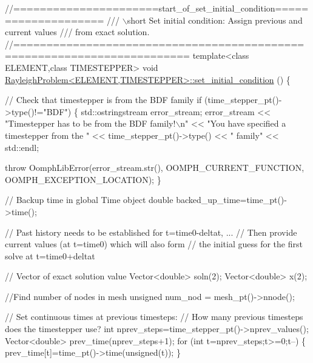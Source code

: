 \begin{DoxyCodeInclude}
\textcolor{comment}{//======================start\_of\_set\_initial\_condition====================}
\textcolor{comment}{/// \(\backslash\)short Set initial condition: Assign previous and current values}
\textcolor{comment}{}\textcolor{comment}{/// from exact solution.}
\textcolor{comment}{}\textcolor{comment}{//========================================================================}
\textcolor{keyword}{template}<\textcolor{keyword}{class} ELEMENT,\textcolor{keyword}{class} TIMESTEPPER>
\textcolor{keywordtype}{void} \hyperlink{classRayleighProblem_a5c54c02c45c656cabbe8f8808e2cfd6b}{RayleighProblem<ELEMENT,TIMESTEPPER>::set\_initial\_condition}
      ()
\{ 

 \textcolor{comment}{// Check that timestepper is from the BDF family}
 \textcolor{keywordflow}{if} (time\_stepper\_pt()->type()!=\textcolor{stringliteral}{"BDF"})
  \{
   std::ostringstream error\_stream;
   error\_stream << \textcolor{stringliteral}{"Timestepper has to be from the BDF family!\(\backslash\)n"}
                << \textcolor{stringliteral}{"You have specified a timestepper from the "}
                << time\_stepper\_pt()->type() << \textcolor{stringliteral}{" family"} << std::endl;

   \textcolor{keywordflow}{throw} OomphLibError(error\_stream.str(),
                       OOMPH\_CURRENT\_FUNCTION,
                       OOMPH\_EXCEPTION\_LOCATION);
  \}

 \textcolor{comment}{// Backup time in global Time object}
 \textcolor{keywordtype}{double} backed\_up\_time=time\_pt()->time();
         
 \textcolor{comment}{// Past history needs to be established for t=time0-deltat, ...}
 \textcolor{comment}{// Then provide current values (at t=time0) which will also form}
 \textcolor{comment}{// the initial guess for the first solve at t=time0+deltat}
 
 \textcolor{comment}{// Vector of exact solution value}
 Vector<double> soln(2);
 Vector<double> x(2);

 \textcolor{comment}{//Find number of nodes in mesh}
 \textcolor{keywordtype}{unsigned} num\_nod = mesh\_pt()->nnode();

 \textcolor{comment}{// Set continuous times at previous timesteps:}
 \textcolor{comment}{// How many previous timesteps does the timestepper use?}
 \textcolor{keywordtype}{int} nprev\_steps=time\_stepper\_pt()->nprev\_values();
 Vector<double> prev\_time(nprev\_steps+1);
 \textcolor{keywordflow}{for} (\textcolor{keywordtype}{int} t=nprev\_steps;t>=0;t--)
  \{
   prev\_time[t]=time\_pt()->time(\textcolor{keywordtype}{unsigned}(t));
  \} 


\end{DoxyCodeInclude}
